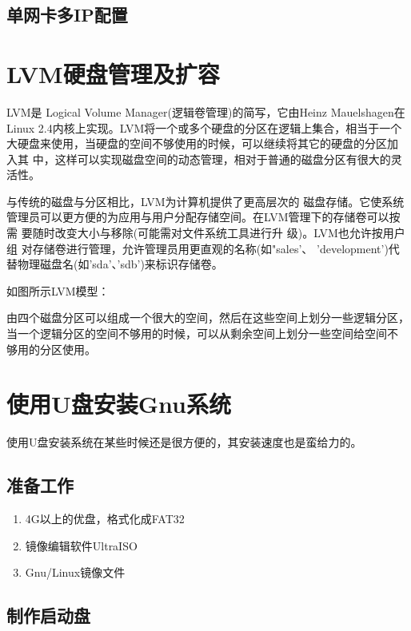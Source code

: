 \section{单网卡多IP配置}
\label{sec:SingleCardMultiIP}

\chapter{LVM硬盘管理及扩容}

LVM是 Logical Volume Manager(逻辑卷管理)的简写，它由Heinz Mauelshagen在
Linux 2.4内核上实现。LVM将一个或多个硬盘的分区在逻辑上集合，相当于一个
大硬盘来使用，当硬盘的空间不够使用的时候，可以继续将其它的硬盘的分区加
入其 中，这样可以实现磁盘空间的动态管理，相对于普通的磁盘分区有很大的灵
活性。
 
与传统的磁盘与分区相比，LVM为计算机提供了更高层次的 磁盘存储。它使系统
管理员可以更方便的为应用与用户分配存储空间。在LVM管理下的存储卷可以按需
要随时改变大小与移除(可能需对文件系统工具进行升 级)。LVM也允许按用户组
对存储卷进行管理，允许管理员用更直观的名称(如"sales'、 'development')代
替物理磁盘名(如'sda'、'sdb')来标识存储卷。
 
如图所示LVM模型：
 
由四个磁盘分区可以组成一个很大的空间，然后在这些空间上划分一些逻辑分区，
当一个逻辑分区的空间不够用的时候，可以从剩余空间上划分一些空间给空间不
够用的分区使用。

\chapter{使用U盘安装Gnu系统}

使用U盘安装系统在某些时候还是很方便的，其安装速度也是蛮给力的。

\section{准备工作}

\begin{enumerate}[itemsep=0pt,parsep=0pt]
\item 4G以上的优盘，格式化成FAT32
\item 镜像编辑软件UltraISO
\item Gnu/Linux镜像文件
\end{enumerate}

\section{制作启动盘}

